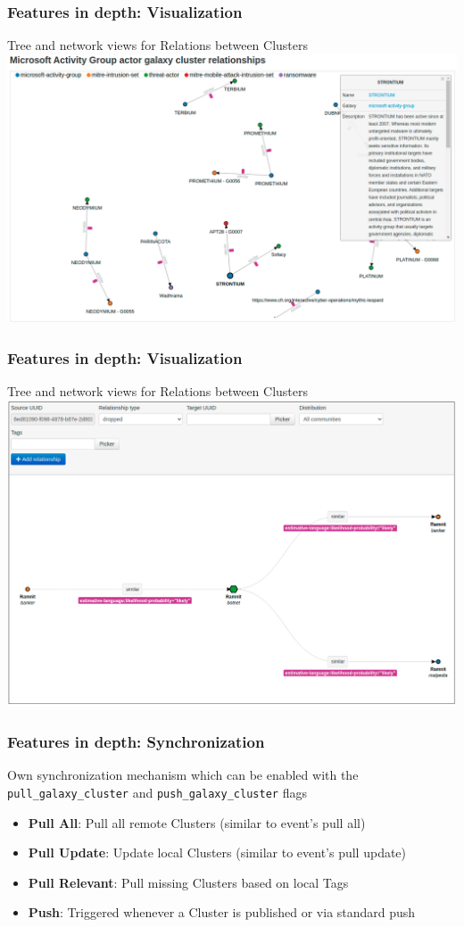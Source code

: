 \begin{frame}
    \frametitle{Features in depth: Visualization}
    Tree and network views for Relations between Clusters
    \includegraphics[width=1.0\linewidth]{pics/cluster-relations}
\end{frame}

\begin{frame}
    \frametitle{Features in depth: Visualization}
    Tree and network views for Relations between Clusters
    \includegraphics[width=1.0\linewidth]{pics/cluster-relations-tree}
\end{frame}

\begin{frame}
    \frametitle{Features in depth: Synchronization}
    Own synchronization mechanism which can be enabled with the \texttt{pull\_galaxy\_cluster} and \texttt{push\_galaxy\_cluster} flags

    \begin{itemize}
        \item \textbf{Pull All}: Pull all remote Clusters (similar to event's pull all)
        \item \textbf{Pull Update}: Update local Clusters (similar to event's pull update)
        \item \textbf{Pull Relevant}: Pull missing Clusters based on local Tags
        \item \textbf{Push}: Triggered whenever a Cluster is published or via standard push
    \end{itemize}
\end{frame}

